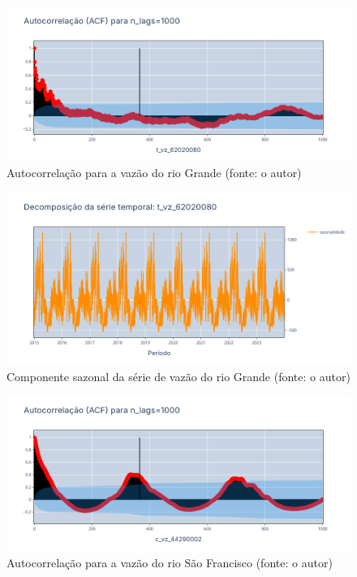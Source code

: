 \begin{figure}[!h]
\centering
\includegraphics[scale=0.33]{Figuras/acf_rio_grande.png}
\caption{Autocorrelação para a vazão do rio Grande (fonte: o autor)}
\label{fig:acf_rio_grande}
\end{figure}

\begin{figure}[!h]
\centering
\includegraphics[scale=0.33]{Figuras/sazonalidade_rio_grande.png}
\caption{Componente sazonal da série de vazão do rio Grande (fonte: o autor)}
\label{fig:sazonalidade_rio_grande}
\end{figure}

\begin{figure}[!h]
\centering
\includegraphics[scale=0.33]{Figuras/acf_rio_sao_francisco.png}
\caption{Autocorrelação para a vazão do rio São Francisco (fonte: o autor)}
\label{fig:acf_rio_sao_francisco}
\end{figure}

